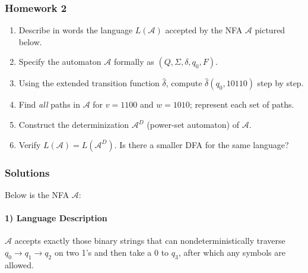 \documentclass{article}
\theoremstyle{theorem}
\theoremstyle{definition}
\theoremstyle{remark}
\begin{document}
\subsubsection*{Homework 2}
\begin{enumerate}
  \item Describe in words the language \(L(\mathcal{A})\) accepted by the NFA \(\mathcal{A}\) pictured below.
  \item Specify the automaton \(\mathcal{A}\) formally as \((Q,\Sigma,\delta,q_0,F)\).
  \item Using the extended transition function \(\hat{\delta}\), compute \(\hat{\delta}(q_0,10110)\) step by step.
  \item Find \emph{all} paths in \(\mathcal{A}\) for \(v=1100\) and \(w=1010\); represent each set of paths.
  \item Construct the determinization \(\mathcal{A}^D\) (power-set automaton) of \(\mathcal{A}\).
  \item Verify \(L(\mathcal{A}) = L(\mathcal{A}^D)\). Is there a smaller DFA for the same language?
\end{enumerate}

\subsubsection*{Solutions}
Below is the NFA \(\mathcal{A}\):

\begin{center}
\end{center}

\paragraph{1) Language Description}  
\(\mathcal{A}\) accepts exactly those binary strings that can nondeterministically traverse  
\(q_0\to q_1\to q_2\) on two 1’s and then take a 0 to \(q_3\), after which any symbols are allowed.
\end{document}
